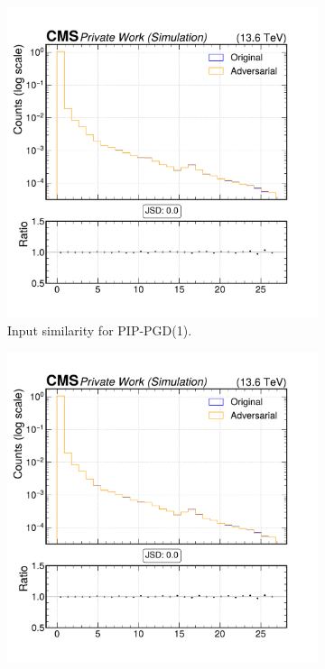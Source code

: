 \begin{figure}[htbp]
  \centering
  \begin{subfigure}[t]{0.32\textwidth}
    \includegraphics[width=\linewidth]{media/output/features/compare/combined_it_1/cmp_vtx_arr_sv_d3d.pdf}
    \caption*{Input similarity for PIP-PGD(1).}
  \end{subfigure}\hfill
  \begin{subfigure}[t]{0.32\textwidth}
    \includegraphics[width=\linewidth]{media/output/features/compare/combined_it_2/cmp_vtx_arr_sv_d3d.pdf}

\end{subfigure}
\end{figure}
